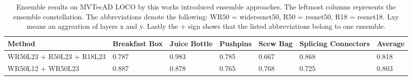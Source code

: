 \begin{table}[htbp]
    \tiny
    \centering
    \begin{tabularx}{\textwidth}{|X|X|X|X|X|X|X|}%
        \hline
        \textbf{Method} & \textbf{Breakfast Box} & \textbf{Juice Bottle} & \textbf{Pushpins} & \textbf{Scew Bag} & \textbf{Splicing Connectors} & \textbf{Average} \\
        \hline
        WR50L23 + R50L23 + R18L23  & 0.787 & 0.983 & 0.785 & 0.667 & 0.868 & 0.818 \\
        \hline
        WR50L12 + WR50L23 & 0.887 & 0.878 & 0.765 & 0.768 & 0.725 & 0.803 \\
        \hline
    \end{tabularx}
    \caption{Ensemble results on MVTecAD LOCO \cite{LOCODentsAndScratchesBergmann2022} by this works introduced ensemble approaches. The leftmost columns represents the ensemble 
             constellation. The abbreviations denote the following: 
             WR50 = wideresnet50, R50 = resnet50, R18 = resnet18. Lxy means an aggreation of layers x and y. Lastly the + sign shows that the listed abbreviations belong to one ensemble.}
    \label{tab:ensemblepixelAUROC}
\end{table}